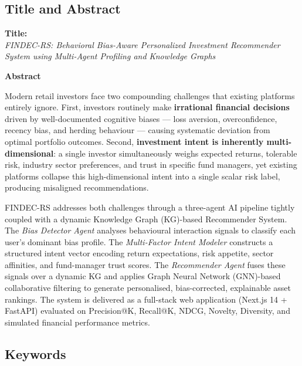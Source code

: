 \documentclass[12pt, a4paper]{article}
\begin{document}
\subsection{Title and Abstract}

\textbf{Title:}\\
\textit{FINDEC-RS: Behavioral Bias-Aware Personalized Investment Recommender System
using Multi-Agent Profiling and Knowledge Graphs}

\vspace{0.5cm}
\textbf{Abstract}

\begin{tcolorbox}[abstractbox]
Modern retail investors face two compounding challenges that existing platforms entirely
ignore. First, investors routinely make \textbf{irrational financial decisions} driven by
well-documented cognitive biases --- loss aversion, overconfidence, recency bias, and
herding behaviour --- causing systematic deviation from optimal portfolio outcomes.
Second, \textbf{investment intent is inherently multi-dimensional}: a single investor
simultaneously weighs expected returns, tolerable risk, industry sector preferences, and
trust in specific fund managers, yet existing platforms collapse this high-dimensional
intent into a single scalar risk label, producing misaligned recommendations.

FINDEC-RS addresses both challenges through a three-agent AI pipeline tightly coupled
with a dynamic Knowledge Graph (KG)-based Recommender System. The \textit{Bias Detector
Agent} analyses behavioural interaction signals to classify each user's dominant bias
profile. The \textit{Multi-Factor Intent Modeler} constructs a structured intent vector
encoding return expectations, risk appetite, sector affinities, and fund-manager trust
scores. The \textit{Recommender Agent} fuses these signals over a dynamic KG and applies
Graph Neural Network (GNN)-based collaborative filtering to generate personalised,
bias-corrected, explainable asset rankings. The system is delivered as a full-stack web
application (Next.js 14 + FastAPI) evaluated on Precision@K, Recall@K, NDCG, Novelty,
Diversity, and simulated financial performance metrics.
\end{tcolorbox}

\subsection{Keywords}
\end{document}
